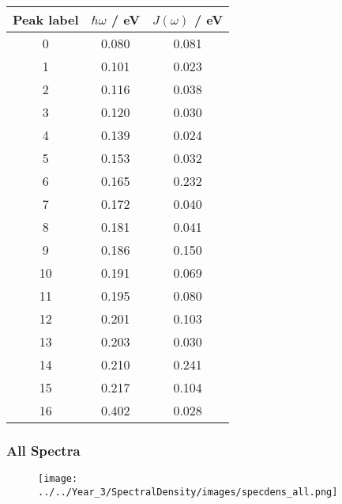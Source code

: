 \begin{table}
    \centering
    \begin{tabular}{||c c c||}
    \hline
    Peak label & $\hbar \omega$ / eV & $J\left(\omega\right)$ / eV \\
    \hline\hline
    
     0 & 0.080 & 0.081 \\
     1 & 0.101 & 0.023 \\
     2 & 0.116 & 0.038 \\
     3 & 0.120 & 0.030 \\
     4 & 0.139 & 0.024 \\
     5 & 0.153 & 0.032 \\
     6 & 0.165 & 0.232 \\
     7 & 0.172 & 0.040 \\
     8 & 0.181 & 0.041 \\
     9 & 0.186 & 0.150 \\
     10 & 0.191 & 0.069 \\
     11 & 0.195 & 0.080 \\
     12 & 0.201 & 0.103 \\
     13 & 0.203 & 0.030 \\
     14 & 0.210 & 0.241 \\
     15 & 0.217 & 0.104 \\
     16 & 0.402 & 0.028 \\
    \hline 
    \end{tabular}
    \end{table}

\afterpartskip
\subsubsection{All Spectra}
\label{subsubsec:specdens_stacked}

\begin{figure}
    \centering
    \texttt{[image: ../../Year\_3/SpectralDensity/images/specdens\_all.png]}
\end{figure}
